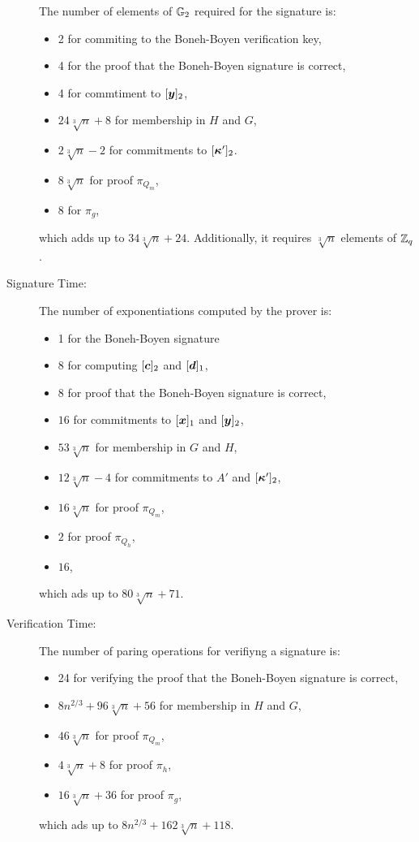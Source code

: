 \begin{description}
The number of elements of $\mathbb{G}_2$ required  for the signature is:
\begin{itemize}
\item 2 for commiting to the Boneh-Boyen verification key,
\item 4 for the proof that the Boneh-Boyen signature is correct,
\item 4 for commtiment to $[{\boldsymbol{y}}]_2$,
\item $24\sqrt[3]{n} + 8$ for membership in $H$ and $G$,
\item $2\sqrt[3]{n}-2$ for commitments to $[{\boldsymbol{\kappa}}']_2$.
\item $8\sqrt[3]{n}$ for proof  $\pi_{Q_m}$,
\item $8$ for $\pi_g$,
\end{itemize}
which adds up to $34\sqrt[3]{n} + 24$. Additionally, it requires $\sqrt[3]{n}$ elements of $\mathbb{Z}_q$.
\item[Signature Time:] The number of exponentiations computed by the prover is:
\begin{itemize}
\item 1 for the Boneh-Boyen signature
\item 8 for computing $[{\boldsymbol{c}}]_2$ and $[{\boldsymbol{d}}]_1$,
\item 8 for proof that the Boneh-Boyen signature is correct,
\item $16$ for commitments to $[{\boldsymbol{x}}]_1$ and $[{\boldsymbol{y}}]_2$,
\item $53\sqrt[3]{n}$ for membership in $G$ and $H$,
\item $12\sqrt[3]{n}-4$ for commitments to $A'$ and $[{\boldsymbol{\kappa}}']_2$,
\item $16\sqrt[3]{n}$ for proof $\pi_{Q_m}$,
\item $2$ for proof $\pi_{Q_h}$,
\item $16$,
\end{itemize}
which ads up to $80\sqrt[3]{n}+71$.
\item[Verification Time:] The number of paring operations for verifiyng a signature is:
\begin{itemize}
\item 24 for verifying the proof that the Boneh-Boyen signature is correct,
\item $8n^{2/3} + 96\sqrt[3]{n} + 56$ for membership in $H$ and $G$,
\item $46\sqrt[3]{n}$ for proof $\pi_{Q_m}$,
\item $4\sqrt[3]{n}+8$ for proof $\pi_h$,
\item $16\sqrt[3]{n}+36$ for proof $\pi_g$,
\end{itemize}
which ads up to $8n^{2/3} + 162\sqrt[3]{n} + 118$.
\end{description}
